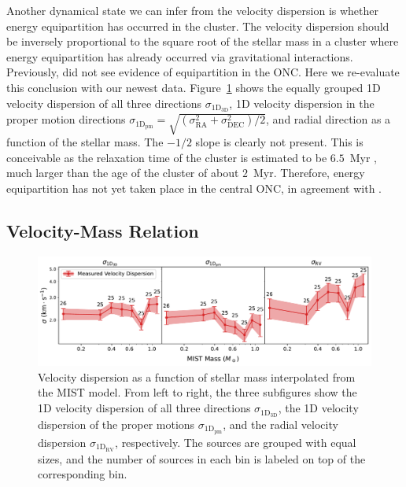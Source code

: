 \documentclass[12pt]{ucsddissertation}
\begin{document}
\begin{CJK*}{UTF8}{gbsn}
Another dynamical state we can infer from the velocity dispersion is whether energy equipartition has occurred in the cluster. The velocity dispersion should be inversely proportional to the square root of the stellar mass in a cluster where energy equipartition has already occurred via gravitational interactions. Previously, \citet{Hillenbrand-1998} did not see evidence of equipartition in the ONC. Here we re-evaluate this conclusion with our newest data. Figure~\ref{fig:vdisp vs mass} shows the equally grouped 1D velocity dispersion of all three directions $\sigma_\mathrm{1D_{3D}}$, 1D velocity dispersion in the proper motion directions $\sigma_\mathrm{1D_{pm}} = \sqrt{\left(\sigma_\mathrm{RA}^2 + \sigma_\mathrm{DEC}^2\right)/2}$, and radial direction as a function of the stellar mass. The $-1/2$ slope is clearly not present. This is conceivable as the relaxation time of the cluster is estimated to be $6.5$~Myr \citep[][]{Hillenbrand-1998}, much larger than the age of the cluster of about $2$~Myr. Therefore, energy equipartition has not yet taken place in the central ONC, in agreement with \citet{Hillenbrand-1998}. 



\subsection{Velocity-Mass Relation}
\label{onc-subsec:v-m}

\begin{figure}[htb!]
    \centering
    \includegraphics[width=\linewidth]{figures/chapter1/vdisp_vs_mass.pdf}
    \caption[Velocity dispersion vs. stellar mass]{Velocity dispersion as a function of stellar mass interpolated from the MIST model. From left to right, the three subfigures show the 1D velocity dispersion of all three directions $\sigma_\mathrm{1D_{3D}}$, the 1D velocity dispersion of the proper motions $\sigma_\mathrm{1D_{pm}}$, and the radial velocity dispersion $\sigma_\mathrm{1D_{RV}}$, respectively. The sources are grouped with equal sizes, and the number of sources in each bin is labeled on top of the corresponding bin.}
    \label{fig:vdisp vs mass}
\end{figure}


\end{CJK*}
\end{document}
